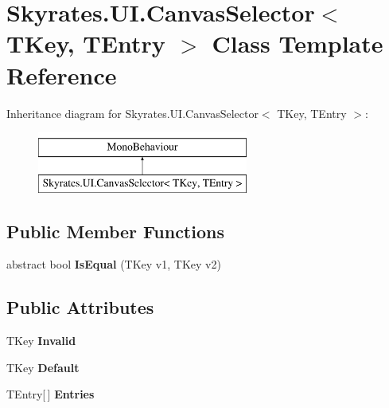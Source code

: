 \hypertarget{class_skyrates_1_1_u_i_1_1_canvas_selector_3_01_t_key_00_01_t_entry_01_4}{\section{Skyrates.\-U\-I.\-Canvas\-Selector$<$ T\-Key, T\-Entry $>$ Class Template Reference}
\label{class_skyrates_1_1_u_i_1_1_canvas_selector_3_01_t_key_00_01_t_entry_01_4}
}
Inheritance diagram for Skyrates.\-U\-I.\-Canvas\-Selector$<$ T\-Key, T\-Entry $>$\-:\begin{figure}[H]
\begin{center}
\leavevmode
\includegraphics[height=2.000000cm]{class_skyrates_1_1_u_i_1_1_canvas_selector_3_01_t_key_00_01_t_entry_01_4}
\end{center}
\end{figure}
\subsection*{Public Member Functions}
\begin{DoxyCompactItemize}
\item 
\hypertarget{class_skyrates_1_1_u_i_1_1_canvas_selector_3_01_t_key_00_01_t_entry_01_4_ac6de420bddaac8ab6ddca055c5159f87}{abstract bool {\bfseries Is\-Equal} (T\-Key v1, T\-Key v2)}\label{class_skyrates_1_1_u_i_1_1_canvas_selector_3_01_t_key_00_01_t_entry_01_4_ac6de420bddaac8ab6ddca055c5159f87}

\end{DoxyCompactItemize}
\subsection*{Public Attributes}
\begin{DoxyCompactItemize}
\item 
\hypertarget{class_skyrates_1_1_u_i_1_1_canvas_selector_3_01_t_key_00_01_t_entry_01_4_ae8535ec3d8b8da3b454c3cdf8d56e8d7}{T\-Key {\bfseries Invalid}}\label{class_skyrates_1_1_u_i_1_1_canvas_selector_3_01_t_key_00_01_t_entry_01_4_ae8535ec3d8b8da3b454c3cdf8d56e8d7}

\item 
\hypertarget{class_skyrates_1_1_u_i_1_1_canvas_selector_3_01_t_key_00_01_t_entry_01_4_a32e6d5442e996dc78f1e71fc20d9c3a1}{T\-Key {\bfseries Default}}\label{class_skyrates_1_1_u_i_1_1_canvas_selector_3_01_t_key_00_01_t_entry_01_4_a32e6d5442e996dc78f1e71fc20d9c3a1}

\item 
\hypertarget{class_skyrates_1_1_u_i_1_1_canvas_selector_3_01_t_key_00_01_t_entry_01_4_ac7d77f213f9158cd29f574e19838a0ae}{T\-Entry\mbox{[}$\,$\mbox{]} {\bfseries Entries}}\label{class_skyrates_1_1_u_i_1_1_canvas_selector_3_01_t_key_00_01_t_entry_01_4_ac7d77f213f9158cd29f574e19838a0ae}

\end{DoxyCompactItemize}
